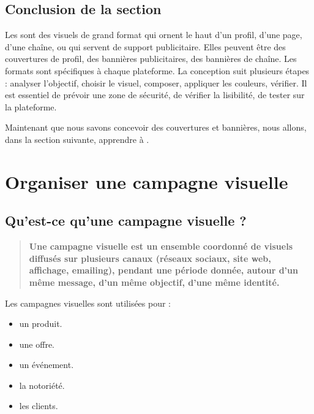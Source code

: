 \subsection*{Conclusion de la section}

Les  sont des visuels de grand format qui ornent le haut d'un profil, d'une page, d'une chaîne, ou qui servent de support publicitaire. Elles peuvent être des couvertures de profil, des bannières publicitaires, des bannières de chaîne. Les formats sont spécifiques à chaque plateforme. La conception suit plusieurs étapes : analyser l'objectif, choisir le visuel, composer, appliquer les couleurs, vérifier. Il est essentiel de prévoir une zone de sécurité, de vérifier la lisibilité, de tester sur la plateforme.

Maintenant que nous savons concevoir des couvertures et bannières, nous allons, dans la section suivante, apprendre à .

\section{Organiser une campagne visuelle}

\subsection{Qu'est-ce qu'une campagne visuelle ?}

\begin{quote}
\textbf{Une campagne visuelle est un ensemble coordonné de visuels diffusés sur plusieurs canaux (réseaux sociaux, site web, affichage, emailing), pendant une période donnée, autour d'un même message, d'un même objectif, d'une même identité.}
\end{quote}

Les campagnes visuelles sont utilisées pour :

\begin{itemize}
    \item {} un produit.
    \item {} une offre.
    \item {} un événement.
    \item {} la notoriété.
    \item {} les clients.
\end{itemize}

